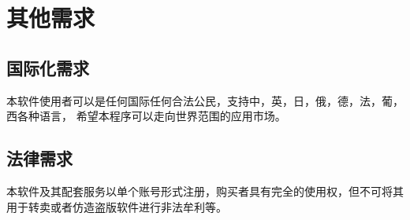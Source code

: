 \section{其他需求}

\subsection{国际化需求}

本软件使用者可以是任何国际任何合法公民，支持中，英，日，俄，德，法，葡，西各种语言，
希望本程序可以走向世界范围的应用市场。

\subsection{法律需求}

本软件及其配套服务以单个账号形式注册，购买者具有完全的使用权，但不可将其用于转卖或者仿造盗版软件进行非法牟利等。